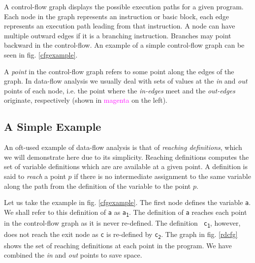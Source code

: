 \documentclass[bsc,twoside,singlespacing,parskip,logo,notimes,normalheadings]{infthesis}
\begin{document}
        \hfill\begin{minipage}{\dimexpr\textwidth-6cm}

          A control-flow graph displays the possible execution paths
          for a given program. Each node in the graph represents an
          instruction or basic block, each edge represents an
          execution path leading from that instruction. A node can
          have multiple outward edges if it is a branching
          instruction. Branches may point backward in the
          control-flow. An example of a simple control-flow graph can
          be seen in fig. \ref{cfgexample}.
          
          \vspace{0.26cm}

          A {\em point} in the control-flow graph refers to some point
          along the edges of the graph. In data-flow analysis we
          usually deal with sets of values at the {\em in} and {\em
            out} points of each node, i.e. the point where the {\em
            in-edges} meet and the {\em out-edges} originate,
          respectively (shown in \textcolor{magenta}{magenta} on the
          left).

        \end{minipage}

	\subsection{A Simple Example}
	An oft-used example of data-flow analysis is that of {\em
          reaching definitions}, which we will demonstrate here due to
        its simplicity. Reaching definitions computes the set of
        variable definitions which are are available at a given
        point. A definition is said to {\em reach} a point $p$ if
        there is no intermediate assignment to the same variable along
        the path from the definition of the variable to the point $p$.
        
        Let us take the example in fig. \ref{cfgexample}. The first
        node defines the variable {\tt a}. We shall refer to this
        definition of {\tt a} as {\tt a\textsubscript{1}}. The
        definition of {\tt a} reaches each point in the control-flow
        graph as it is never re-defined. The definition {\tt
          c\textsubscript{1}}, however, does not reach the exit node
        as {\tt c} is re-defined by {\tt c\textsubscript{2}}. The
        graph in fig. \ref{rdcfg} shows the set of reaching
        definitions at each point in the program. We have combined the
        {\em in} and {\em out} points to save space.
        
\end{document}
